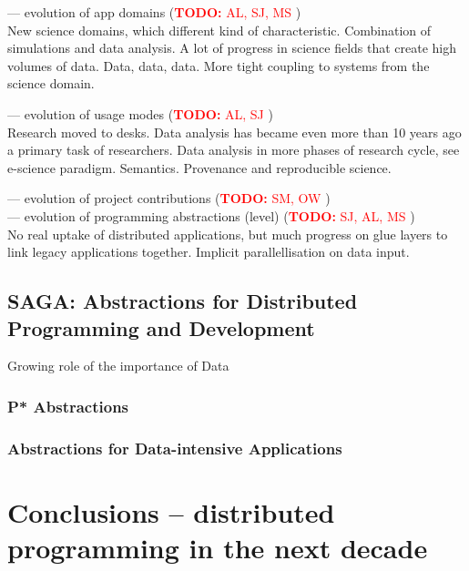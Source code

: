 \documentclass{article}
\newcommand{\B}[1]{\textbf{#1}}
\newcommand{\todo}[1]{{\textcolor{red}{\B{TODO:} #1 }}}
\begin{document}
 --- evolution of app domains (\todo{AL, SJ, MS})\\
 
 New science domains, which different kind of characteristic.
 Combination of simulations and data analysis. A lot of progress in science fields that create high volumes of data.
Data, data, data.
More tight coupling to systems from the science domain.
 
 --- evolution of usage modes (\todo{AL, SJ})\\
 
 Research moved to desks. Data analysis has became even more than 10 years ago a primary task of researchers.
 Data analysis in more phases of research cycle, see e-science paradigm.
Semantics.
Provenance and reproducible science.
  
 --- evolution of project contributions (\todo{SM, OW})\\
 
 --- evolution of programming abstractions (level) (\todo{SJ, AL, MS})\\
 
No real uptake of distributed applications, but much progress on glue layers to link legacy applications together.
Implicit parallellisation on data input.


\subsection{SAGA: Abstractions for Distributed Programming and
  Development}

Growing role of the importance of Data


\subsubsection{P* Abstractions}

\subsubsection{Abstractions for Data-intensive Applications}


\section{Conclusions -- distributed programming in the next decade}
\label{sec:sum}







\footnotesize


\end{document}
